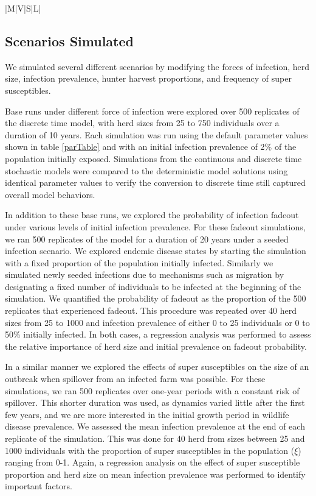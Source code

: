 \documentclass[number,preprint,review,12pt]{elsarticle}
\begin{document}
\begin{center}
\begin{longtable}{|M|V|S|L|}
\label{parTable}
\end{longtable}


\end{center}
\subsection{Scenarios Simulated}
\doublespacing
We simulated several different scenarios by modifying the forces of infection, herd size, infection prevalence, hunter harvest proportions, and frequency of super susceptibles. 

Base runs under different force of infection were explored over 500 replicates of the discrete time model, with herd sizes from 25 to 750 individuals over a duration of 10 years. Each simulation was run using the default parameter values shown in table \ref{parTable} and with an initial infection prevalence of 2\% of the population initially exposed\citep{Fitzgerald2013}. Simulations from the continuous and discrete time stochastic models were compared to the deterministic model solutions using identical parameter values to verify the conversion to discrete time still captured overall model behaviors. 

In addition to these base runs, we explored the probability of infection fadeout under various levels of initial infection prevalence. For these fadeout simulations, we ran 500 replicates of the model for a duration of 20 years under a seeded infection scenario. We explored endemic disease states by starting the simulation with a fixed proportion of the population initially infected. Similarly we simulated newly seeded infections due to mechanisms such as migration by designating a fixed number of individuals to be infected at the beginning of the simulation. We quantified the probability of fadeout as the proportion of the 500 replicates that experienced fadeout. This procedure was repeated over 40 herd sizes from 25 to 1000 and infection prevalence of either 0 to 25 individuals or 0 to 50\% initially infected. In both cases, a regression analysis was performed to assess the relative importance of herd size and initial prevalence on fadeout probability.

In a similar manner we explored the effects of super susceptibles on the size of an outbreak when spillover from an infected farm was possible. For these simulations, we ran 500 replicates over one-year periods with a constant risk of spillover. This shorter duration was used, as dynamics varied little after the first few years, and we are more interested in the initial growth period in wildlife disease prevalence. We assessed the mean infection prevalence at the end of each replicate of the simulation. This was done for 40 herd from sizes between 25 and 1000 individuals with the proportion of super susceptibles in the population ($\xi$) ranging from 0-1. Again, a regression analysis on the effect of super susceptible proportion and herd size on mean infection prevalence was performed to identify important factors.
\end{document}
